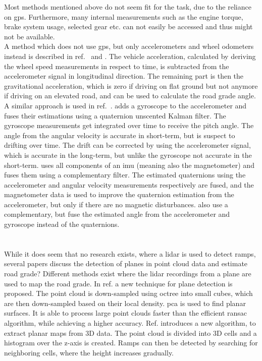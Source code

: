 Most methods mentioned above do not seem fit for the task, due to the reliance on \gls{gps}.
Furthermore, many internal measurements such as the engine torque, brake system usage, selected gear etc. can not easily be accessed and thus might not be available.\\
A method which does not use \gls{gps}, but only accelerometers and wheel odometers instead is described in ref.~\cite{Nilsson2012} and \cite{Palella2016}.
The vehicle acceleration, calculated by deriving the wheel speed measurements in respect to time, is subtracted from the accelerometer signal in longitudinal direction.
The remaining part is then the gravitational acceleration, which is zero if driving on flat ground but not anymore if driving on an elevated road, and can be used to calculate the road grade angle.
A similar approach is used in ref.~\cite{Sentouh2008}.
\cite{He2020} adds a gyroscope to the accelerometer and fuses their estimations using a quaternion unscented Kalman filter.
The gyroscope measurements get integrated over time to receive the pitch angle.
The angle from the angular velocity is accurate in short-term, but is suspect to drifting over time.
The drift can be corrected by using the accelerometer signal, which is accurate in the long-term, but unlike the gyroscope not accurate in the short-term.
\cite{Wu2016} uses all components of an \gls{imu} (meaning also the magnetometer) and fuses them using a complementary filter.
The estimated quaternions using the accelerometer and angular velocity measurements respectively are fused, and the magnetometer data is used to improve the quaternion estimation from the accelerometer, but only if there are no magnetic disturbances.
\cite{Euston2008,Jauch2018} also use a complementary, but fuse the estimated angle from the accelerometer and gyroscope instead of the quaternions.



\section{}
While it does seem that no research exists, where a \gls{lidar} is used to detect ramps, several papers discuss the detection of planes in point cloud data and estimate road grade?
Different methods exist where the \gls{lidar} recordings from a plane are used to map the road grade.
In ref.\cite{El-Sayed2018} a new technique for plane detection is proposed.
The point cloud is down-sampled using octree into small cubes, which are then down-sampled based on their local density.
\gls{pca} is used to find planar surfaces.
It is able to process large point clouds faster than the efficient \gls{ransac} algorithm, while achieving a higher accuracy.
Ref. \cite{Sakenas2007} introduces a new algorithm, to extract planar maps from 3D data.
The point cloud is divided into 3D cells and a histogram over the z-axis is created.
Ramps can then be detected by searching for neighboring cells, where the height increases gradually.

